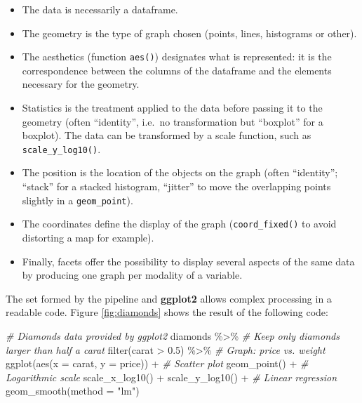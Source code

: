 \documentclass[
  12pt,
  american,
  a4paper,
  extrafontsizes,onecolumn,openright
  ]{memoir}
\newenvironment{Shaded}{\begin{snugshade}}{\end{snugshade}}
\newcommand{\AttributeTok}[1]{\textcolor[rgb]{0.77,0.63,0.00}{#1}}
\newcommand{\CommentTok}[1]{\textcolor[rgb]{0.56,0.35,0.01}{\textit{#1}}}
\newcommand{\FloatTok}[1]{\textcolor[rgb]{0.00,0.00,0.81}{#1}}
\newcommand{\FunctionTok}[1]{\textcolor[rgb]{0.00,0.00,0.00}{#1}}
\newcommand{\NormalTok}[1]{#1}
\newcommand{\SpecialCharTok}[1]{\textcolor[rgb]{0.00,0.00,0.00}{#1}}
\newcommand{\StringTok}[1]{\textcolor[rgb]{0.31,0.60,0.02}{#1}}
\providecommand{\tightlist}{%
  \setlength{\itemsep}{0pt}\setlength{\parskip}{0pt}}
\begin{document}
\begin{itemize}
\tightlist
\item
  The data is necessarily a dataframe.
\item
  The geometry is the type of graph chosen (points, lines, histograms or other).
\item
  The aesthetics (function \texttt{aes()}) designates what is represented: it is the correspondence between the columns of the dataframe and the elements necessary for the geometry.
\item
  Statistics is the treatment applied to the data before passing it to the geometry (often \enquote{identity}, i.e.~no transformation but \enquote{boxplot} for a boxplot).
  The data can be transformed by a scale function, such as \texttt{scale\_y\_log10()}.
\item
  The position is the location of the objects on the graph (often \enquote{identity}; \enquote{stack} for a stacked histogram, \enquote{jitter} to move the overlapping points slightly in a \texttt{geom\_point}).
\item
  The coordinates define the display of the graph (\texttt{coord\_fixed()} to avoid distorting a map for example).
\item
  Finally, facets offer the possibility to display several aspects of the same data by producing one graph per modality of a variable.
\end{itemize}

The set formed by the pipeline and \textbf{ggplot2} allows complex processing in a readable code.
Figure \ref{fig:diamonds} shows the result of the following code:



\scriptsize

\begin{Shaded}
\begin{Highlighting}[]
\CommentTok{\# Diamonds data provided by ggplot2}
\NormalTok{diamonds }\SpecialCharTok{\%\textgreater{}\%} 
  \CommentTok{\# Keep only diamonds larger than half a carat}
  \FunctionTok{filter}\NormalTok{(carat }\SpecialCharTok{\textgreater{}} \FloatTok{0.5}\NormalTok{) }\SpecialCharTok{\%\textgreater{}\%} 
  \CommentTok{\# Graph: price vs. weight}
  \FunctionTok{ggplot}\NormalTok{(}\FunctionTok{aes}\NormalTok{(}\AttributeTok{x =}\NormalTok{ carat, }\AttributeTok{y =}\NormalTok{ price)) }\SpecialCharTok{+}
    \CommentTok{\# Scatter plot}
    \FunctionTok{geom\_point}\NormalTok{() }\SpecialCharTok{+} 
    \CommentTok{\# Logarithmic scale}
    \FunctionTok{scale\_x\_log10}\NormalTok{() }\SpecialCharTok{+} 
    \FunctionTok{scale\_y\_log10}\NormalTok{() }\SpecialCharTok{+} 
    \CommentTok{\# Linear regression}
    \FunctionTok{geom\_smooth}\NormalTok{(}\AttributeTok{method =} \StringTok{"lm"}\NormalTok{)}
\end{Highlighting}
\end{Shaded}
\end{document}
